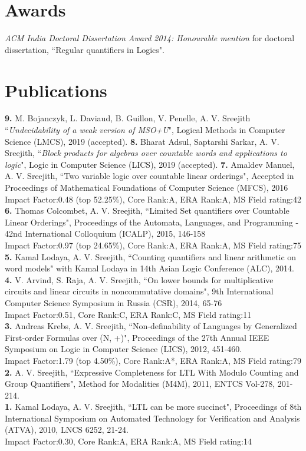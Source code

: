 \documentclass[margin]{res}
\begin{document}
\begin{resume}
					
\section{Awards}
\emph{ACM India Doctoral Dissertation Award 2014: Honourable mention} for doctoral dissertation, ``Regular quantifiers in Logics".
 
\section{Publications}
{\bf 9.} M. Bojanczyk, L. Daviaud, B. Guillon, V. Penelle, A. V. Sreejith ``\emph{Undecidability of a weak version of MSO+U}", Logical Methods in Computer Science (LMCS), 2019 (accepted).
{\bf 8.} Bharat Adsul, Saptarshi Sarkar, A. V. Sreejith, ``\emph{Block products for algebras over countable words and applications to logic}", Logic in Computer Science (LICS), 2019 (accepted).
{\bf 7.} Amaldev Manuel, A. V. Sreejith, ``Two variable logic over countable linear orderings", Accepted in Proceedings of Mathematical Foundations of Computer Science (MFCS), 2016 \\
Impact Factor:0.48 (top 52.25\%), Core Rank:A, ERA Rank:A, MS Field rating:42 \\
{\bf 6.} Thomas Colcombet, A. V. Sreejith, ``Limited Set quantifiers over Countable Linear Orderings", Proceedings of the Automata, Languages, and Programming - 42nd International Colloquium (ICALP), 2015, 146-158 \\
Impact Factor:0.97 (top 24.65\%), Core Rank:A, ERA Rank:A, MS Field rating:75\\
{\bf 5.} Kamal Lodaya, A. V. Sreejith, ``Counting quantifiers and linear arithmetic on word models" with Kamal Lodaya in 14th Asian Logic Conference (ALC), 2014. \\
{\bf 4.} V. Arvind, S. Raja, A. V. Sreejith, ``On lower bounds for multiplicative circuits and linear circuits in noncommutative domains", 9th International Computer Science Symposium in Russia (CSR), 2014, 65-76\\
Impact Factor:0.51, Core Rank:C, ERA Rank:C, MS Field rating:11 \\
{\bf 3.} Andreas Krebs, A. V. Sreejith, ``Non-definability of Languages by Generalized First-order Formulas over (N, +)", Proceedings of the 27th Annual IEEE Symposium on Logic in Computer Science (LICS), 2012, 451-460.\\
Impact Factor:1.79 (top 4.50\%), Core Rank:A*, ERA Rank:A, MS Field rating:79 \\
{\bf 2.} A. V. Sreejith, ``Expressive Completeness for LTL With Modulo Counting and Group Quantifiers", Method for Modalities (M4M), 2011, ENTCS Vol-278, 201-214.\\
{\bf 1.} Kamal Lodaya, A. V. Sreejith, ``LTL can be more succinct", Proceedings of 8th International Symposium on Automated Technology for Verification and Analysis (ATVA), 2010, LNCS 6252, 21-24. \\
Impact Factor:0.30, Core Rank:A, ERA Rank:A, MS Field rating:14\\



\end{resume}
\end{document}
